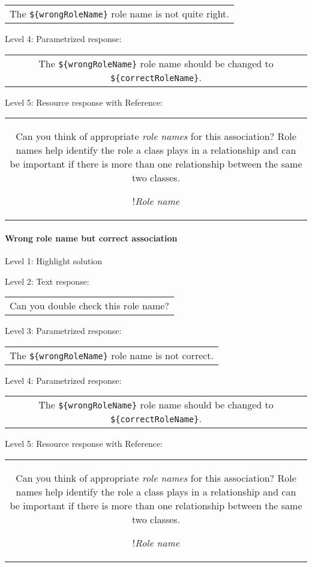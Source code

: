 \begin{tabular}{|c}
The \verb|${wrongRoleName}| role name is not quite right.
\end{tabular} \medskip

\noindent Level 4: Parametrized response: \medskip

\begin{tabular}{|c}
The \verb|${wrongRoleName}| role name should be changed to \verb|${correctRoleName}|.
\end{tabular} \medskip

\noindent Level 5: Resource response with Reference:

\begin{tabular}{|c}
Can you think of appropriate \textit{role names}
for this association? Role names help identify the role a class plays in a
relationship and can be important if there is more than one relationship
between the same two classes.

!\textit{Role name}

\end{tabular} \medskip


\paragraph{Wrong role name but correct association}

\noindent Level 1: Highlight solution \medskip

\noindent Level 2: Text response: \medskip

\begin{tabular}{|c}
Can you double check this role name?
\end{tabular} \medskip

\noindent Level 3: Parametrized response: \medskip

\begin{tabular}{|c}
The \verb|${wrongRoleName}| role name is not correct.
\end{tabular} \medskip

\noindent Level 4: Parametrized response: \medskip

\begin{tabular}{|c}
The \verb|${wrongRoleName}| role name should be changed to \verb|${correctRoleName}|.
\end{tabular} \medskip

\noindent Level 5: Resource response with Reference:

\begin{tabular}{|c}
Can you think of appropriate \textit{role names}
for this association? Role names help identify the role a class plays in a
relationship and can be important if there is more than one relationship
between the same two classes.

!\textit{Role name}

\end{tabular} \medskip


